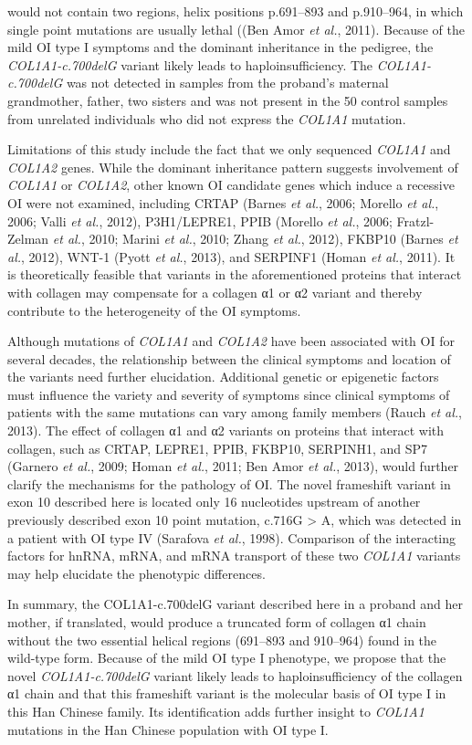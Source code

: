would not contain two regions, helix positions p.691–893 and p.910–964, in which single point mutations are usually lethal ((Ben Amor \textit{et al.}, 2011). Because of the mild OI type I symptoms and the dominant inheritance in the pedigree, the \textit{COL1A1-c.700delG} variant likely leads to haploinsufficiency. The \textit{COL1A1-c.700delG} was not detected in samples from the proband’s maternal grandmother, father, two sisters and was not present in the 50 control samples from unrelated individuals who did not express the \textit{COL1A1} mutation.\par Limitations of this study include the fact that we only sequenced \textit{COL1A1} and \textit{COL1A2} genes. While the dominant inheritance pattern suggests involvement of \textit{COL1A1} or \textit{COL1A2}, other known OI candidate genes which induce a recessive OI were not examined, including CRTAP (Barnes \textit{et al.}, 2006; Morello \textit{et al.}, 2006; Valli \textit{et al.}, 2012), P3H1/LEPRE1, PPIB (Morello \textit{et al.}, 2006; Fratzl-Zelman \textit{et al.}, 2010; Marini \textit{et al.}, 2010; Zhang \textit{et al.}, 2012), FKBP10 (Barnes \textit{et al.}, 2012), WNT-1 (Pyott \textit{et al.}, 2013), and SERPINF1 (Homan \textit{et al.}, 2011). It is theoretically feasible that variants in the aforementioned proteins that interact with collagen may compensate for a collagen α1 or α2 variant and thereby contribute to the heterogeneity of the OI symptoms.\par Although mutations of \textit{COL1A1} and \textit{COL1A2} have been associated with OI for several decades, the relationship between the clinical symptoms and location of the variants need further elucidation. Additional genetic or epigenetic factors must influence the variety and severity of symptoms since clinical symptoms of patients with the same mutations can vary among family members (Rauch \textit{et al.}, 2013). The effect of collagen α1 and α2 variants on proteins that interact with collagen, such as CRTAP, LEPRE1, PPIB, FKBP10, SERPINH1, and SP7 (Garnero \textit{et al.}, 2009; Homan \textit{et al.}, 2011; Ben Amor \textit{et al.}, 2013), would further clarify the mechanisms for the pathology of OI. The novel frameshift variant in exon 10 described here is located only 16 nucleotides upstream of another previously described exon 10 point mutation, c.716G > A, which was detected in a patient with OI type IV (Sarafova \textit{et al.}, 1998). Comparison of the interacting factors for hnRNA, mRNA, and mRNA transport of these two \textit{COL1A1} variants may help elucidate the phenotypic differences.\par In summary, the COL1A1-c.700delG variant described here in a proband and her mother, if translated, would produce a truncated form of collagen α1 chain without the two essential helical regions (691–893 and 910–964) found in the wild-type form. Because of the mild OI type I phenotype, we propose that the novel \textit{COL1A1-c.700delG} variant likely leads to haploinsufficiency of the collagen α1 chain and that this frameshift variant is the molecular basis of OI type I in this Han Chinese family. Its identification adds further insight to \textit{COL1A1} mutations in the Han Chinese population with OI type I.
